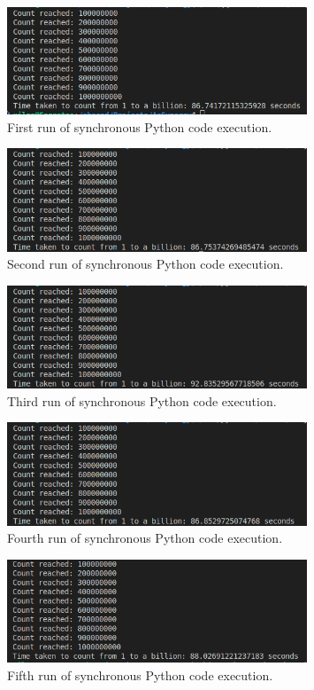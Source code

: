 \documentclass[12pt,a4paper]{article}
\begin{document}
\begin{figure}[htbp]
    \centering
    \includegraphics[width=0.8\textwidth]{../sync_records/results_python/result_1.png}
    \caption{First run of synchronous Python code execution.}
    \label{fig:Python-runtime-1}
\end{figure}

\begin{figure}[htbp]
    \centering
    \includegraphics[width=0.8\textwidth]{../sync_records/results_python/result_2.png}
    \caption{Second run of synchronous Python code execution.}
    \label{fig:Python-runtime-2}
\end{figure}

\begin{figure}[htbp]
    \centering
    \includegraphics[width=0.8\textwidth]{../sync_records/results_python/result_3.png}
    \caption{Third run of synchronous Python code execution.}
    \label{fig:Python-runtime-3}
\end{figure}

\begin{figure}[htbp]
    \centering
    \includegraphics[width=0.8\textwidth]{../sync_records/results_python/result_4.png}
    \caption{Fourth run of synchronous Python code execution.}
    \label{fig:Python-runtime-4}
\end{figure}

\begin{figure}[htbp]
    \centering
    \includegraphics[width=0.8\textwidth]{../sync_records/results_python/result_5.png}
    \caption{Fifth run of synchronous Python code execution.}
    \label{fig:Python-runtime-5}
\end{figure}
\end{document}
